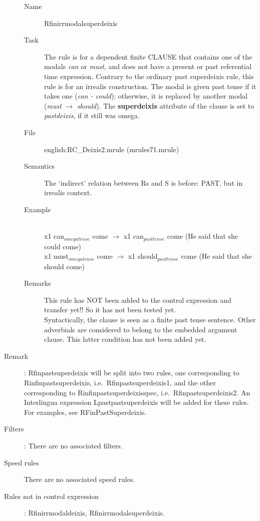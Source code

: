 \begin{description}
\vspace{1 cm}
\begin{description}
\item[Name] Rfinirrmodalsuperdeixis
\item[Task] The rule is for a dependent finite CLAUSE that contains one of 
the modals {\em can\/} or {\em must\/}, and does not have a present or 
past
referential time expression. Contrary to the ordinary past superdeixis rule, 
this rule is for an irrealis construction. The 
modal is given past tense if it takes one ({\em can - could\/}); otherwise, it 
is replaced by another modal ({\em must\/} $\rightarrow$ {\em should\/}).
The {\bf superdeixis} attribute of the clause is set to {\em pastdeixis\/}, if
 it still was omega.
\item[File] english:RC\_Deixis2.mrule (mrules71.mrule)
\item[Semantics] The `indirect' relation between Rs and S is before: PAST, but 
in irrealis context.
\item[Example] \mbox{}\\
x1 can$_{omegatense}$ come $\rightarrow$ x1 can$_{pasttense}$ come (He said 
that she could come)\\
x1 must$_{omegatense}$ come $\rightarrow$ x1 should$_{pasttense}$ come (He said 
that she should come)
\item[Remarks] This rule has NOT been added to the control expression and 
transfer yet!! So it has not been tested yet.\\
Syntactically, the clause is seen as a finite past tense sentence. Other adverbials 
are considered to belong to the embedded argument clause. This latter 
condition has not been added yet.
\end{description}

\item[Remark]: Rfinpastsuperdeixis will be split into two rules, one 
corresponding to Rinfinpastsuperdeixis, i.e.\ Rfinpastsuperdeixis1, and the 
other corresponding to Rinfinpastsuperdeixisspec, i.e.\ Rfinpastsuperdeixis2. 
An Interlingua expression Lpastpastsuperdeixis will be added for these rules. 
For examples, see RFinPastSuperdeixis.
\item[Filters]: There are no associated filters.
\item[Speed rules] There are no associated speed rules.
\item[Rules not in control expression]:
Rfinirrmodaldeixis, Rfinirrmodalsuperdeixis.
\end{description}

